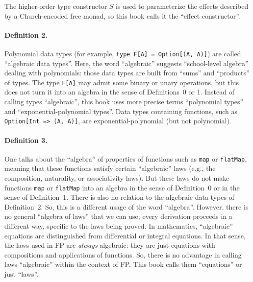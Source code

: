 The higher-order type constructor $S$ is used to parameterize the
effects described by a Church-encoded free monad, so this book calls
it the \textsf{``}effect constructor\textsf{''}.

\paragraph{Definition 2.}

Polynomial data types (for example, \lstinline!type F[A] = Option[(A, A)]!)
are called \textquotedblleft algebraic data types\textquotedblright .
Here, the word \textsf{``}algebraic\textsf{''} suggests \textsf{``}school-level algebra\textsf{''}
dealing with polynomials: those data types are built from \textsf{``}sums\textsf{''}
and \textsf{``}products\textsf{''} of types. The type \lstinline!F[A]! may admit
some binary or unary operations, but this does not turn it into an
algebra in the sense of Definitions~0 or 1. Instead of calling types
\textsf{``}algebraic\textsf{''}, this book uses more precise terms \textquotedblleft polynomial
types\textquotedblright{} and \textquotedblleft exponential-polynomial
types\textquotedblright . Data types containing functions, such as
\lstinline!Option[Int => (A, A)]!, are exponential-polynomial (but
not polynomial).

\paragraph{Definition 3.}

One talks about the \textquotedblleft algebra\textquotedblright{}
of properties of functions such as \lstinline!map! or \lstinline!flatMap!,
meaning that these functions satisfy certain \textsf{``}algebraic\textsf{''} laws
(e.g., the composition, naturality, or associativity laws). But these
laws do not make functions \lstinline!map! or \lstinline!flatMap!
into an algebra in the sense of Definition~0 or in the sense of Definition~1.
There is also no relation to the algebraic data types of Definition~2.
So, this is a different usage of the word \textsf{``}algebra\textsf{''}. However,
there is no general \textsf{``}algebra of laws\textsf{''} that we can use; every derivation
proceeds in a different way, specific to the laws being proved. In
mathematics, \textsf{``}algebraic\textsf{''} equations are distinguished from differential
or integral equations. In that sense, the laws used in FP are \emph{always}
algebraic: they are just equations with compositions and applications
of functions. So, there is no advantage in calling laws \textsf{``}algebraic\textsf{''}
within the context of FP. This book calls them \textsf{``}equations\textsf{''} or
just \textsf{``}laws\textsf{''}.

